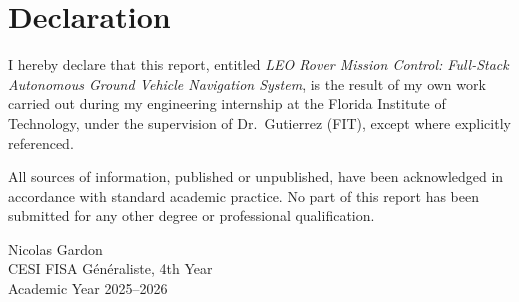 \chapter*{Declaration}

I hereby declare that this report, entitled \emph{LEO Rover Mission Control: Full-Stack Autonomous Ground Vehicle Navigation System}, is the result of my own work carried out during my engineering internship at the Florida Institute of Technology, under the supervision of Dr.\ Gutierrez (FIT), except where explicitly referenced.

All sources of information, published or unpublished, have been acknowledged in accordance with standard academic practice. No part of this report has been submitted for any other degree or professional qualification.

\vspace{1.5cm}
\noindent Nicolas Gardon \\
CESI FISA Généraliste, 4th Year \\
Academic Year 2025--2026
